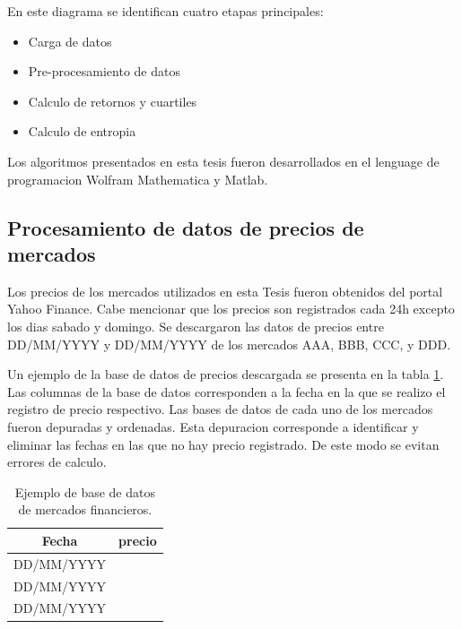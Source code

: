 En este diagrama se identifican cuatro etapas principales:

\begin{itemize}
	\item Carga de datos
	\item Pre-procesamiento de datos
	\item Calculo de retornos y cuartiles
	\item Calculo de entropia
\end{itemize}

Los algoritmos presentados en esta tesis fueron desarrollados en el lenguage de programacion Wolfram Mathematica y Matlab.


\subsection{Procesamiento de datos de precios de mercados}
\label{sec_data}
Los precios de los mercados utilizados en esta Tesis fueron obtenidos del portal Yahoo Finance. 
Cabe mencionar que los precios son registrados cada 24h excepto los dias sabado y domingo.
Se descargaron las datos de precios entre DD/MM/YYYY y DD/MM/YYYY de los mercados AAA, BBB, CCC, y DDD.

Un ejemplo de la base de datos de precios descargada se presenta en la tabla \ref{ejemplo_data}.
Las columnas de la base de datos corresponden a la fecha en la que se realizo el registro de precio respectivo.
Las bases de datos de cada uno de los mercados fueron depuradas y ordenadas. Esta depuracion corresponde a identificar y eliminar las fechas en las que no hay precio registrado. De este modo se evitan errores de calculo.

\begin{table}
\begin{center}
\begin{tabular}{|c|c|}
	\hline 
	Fecha & precio \\ 
	\hline 
	DD/MM/YYYY & $$$$ \\ 
	DD/MM/YYYY & $$$$ \\ 
	DD/MM/YYYY & $$$$ \\ 
	\hline 
\end{tabular} 
	\label{ejemplo_data}
	\caption{Ejemplo de base de datos de mercados financieros.}
\end{center}
\end{table}

